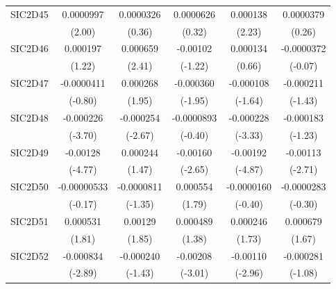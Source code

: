 \begin{table}[htbp]
\begin{tabular}{l*{5}{c}}
SIC2D45     &   0.0000997\sym{*}  &   0.0000326         &   0.0000626         &    0.000138\sym{*}  &   0.0000379         \\
            &      (2.00)         &      (0.36)         &      (0.32)         &      (2.23)         &      (0.26)         \\
SIC2D46     &    0.000197         &    0.000659\sym{*}  &    -0.00102         &    0.000134         &  -0.0000372         \\
            &      (1.22)         &      (2.41)         &     (-1.22)         &      (0.66)         &     (-0.07)         \\
SIC2D47     &  -0.0000411         &    0.000268         &   -0.000360         &   -0.000108         &   -0.000211         \\
            &     (-0.80)         &      (1.95)         &     (-1.95)         &     (-1.64)         &     (-1.43)         \\
SIC2D48     &   -0.000226\sym{***}&   -0.000254\sym{**} &  -0.0000893         &   -0.000228\sym{***}&   -0.000183         \\
            &     (-3.70)         &     (-2.67)         &     (-0.40)         &     (-3.33)         &     (-1.23)         \\
SIC2D49     &    -0.00128\sym{***}&    0.000244         &    -0.00160\sym{**} &    -0.00192\sym{***}&    -0.00113\sym{**} \\
            &     (-4.77)         &      (1.47)         &     (-2.65)         &     (-4.87)         &     (-2.71)         \\
SIC2D50     & -0.00000533         &  -0.0000811         &    0.000554         &  -0.0000160         &  -0.0000283         \\
            &     (-0.17)         &     (-1.35)         &      (1.79)         &     (-0.40)         &     (-0.30)         \\
SIC2D51     &    0.000531         &     0.00129         &    0.000489         &    0.000246         &    0.000679         \\
            &      (1.81)         &      (1.85)         &      (1.38)         &      (1.73)         &      (1.67)         \\
SIC2D52     &   -0.000834\sym{**} &   -0.000240         &    -0.00208\sym{**} &    -0.00110\sym{**} &   -0.000281         \\
            &     (-2.89)         &     (-1.43)         &     (-3.01)         &     (-2.96)         &     (-1.08)         \\

\end{tabular}
\end{table}
